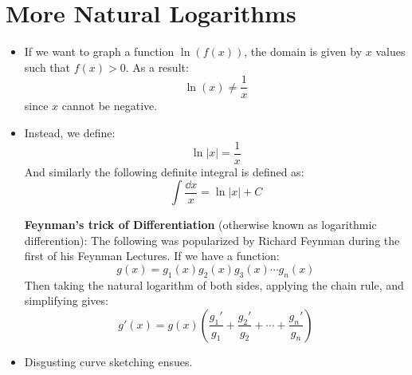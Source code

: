 \section{More Natural Logarithms}
\begin{itemize}
    \item If we want to graph a function $\ln(f(x))$, the domain is given by $x$ values such that $f(x)>0$. As a result:
    \begin{equation}
        \ln(x) \neq \frac{1}{x}
        \label{eq:}
    \end{equation}
    since $x$ cannot be negative.
    \item Instead, we define:
    \begin{equation}
        \ln|x| = \frac{1}{x}
        \label{eq:}
    \end{equation}
    And similarly the following definite integral is defined as:
    \begin{equation}
        \int \frac{\dd{x}}{x} = \ln|x|+C
        \label{eq:}
    \end{equation}
    \begin{theorem}
        \textbf{Feynman's trick of Differentiation} (otherwise known as logarithmic differention): The following was popularized by Richard Feynman during the first of his Feynman Lectures. If we have a function:
        \begin{equation}
            g(x)=g_1(x)g_2(x)g_3(x)\cdots g_n(x)
            \label{eq:}
        \end{equation}
         Then taking the natural logarithm of both sides, applying the chain rule, and simplifying gives:
         \begin{equation}
             g'(x) = g(x)\left(\frac{g_1'}{g_1}+\frac{g_2'}{g_2}+\cdots+\frac{g_n'}{g_n}\right)
             \label{eq:}
         \end{equation}
         
    \end{theorem}
    \item Disgusting curve sketching ensues.
\end{itemize}